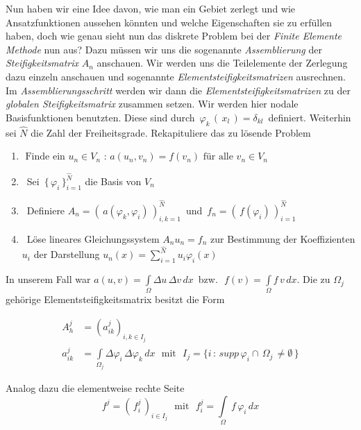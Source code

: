 Nun haben wir eine Idee davon, wie man ein Gebiet zerlegt und wie Ansatzfunktionen aussehen könnten und welche Eigenschaften sie zu erfüllen haben, doch wie genau sieht nun das diskrete Problem bei der \textit{Finite Elemente Methode} nun aus? Dazu müssen wir uns die sogenannte \textit{Assemblierung} der \textit{Steifigkeitsmatrix} $A_n$ anschauen. Wir werden uns die Teilelemente der Zerlegung dazu einzeln anschauen und sogenannte \textit{Elementsteifigkeitsmatrizen} ausrechnen. Im \textit{Assemblierungsschritt} werden wir dann die  \textit{Elementsteifigkeitsmatrizen} zu der \textit{globalen Steifigkeitsmatrix} zusammen setzen.
Wir werden hier nodale Basisfunktionen benutzten. Diese sind durch $\, \varphi_k \, ( \, x_l \, ) = \delta_{kl} \,$ definiert. Weiterhin sei $\hat{N}$ die Zahl der Freiheitsgrade. Rekapituliere das zu lösende Problem

\begin{framed}
\begin{enumerate}
\item $
\text{ Finde ein } u_n \in V_n \text{ : } a(u_n,v_n) = f(v_n) \text{ für alle } v_n \in V_n
$
\item ~Sei $\, \{ \, \varphi_i \, \}_{i=1}^{\hat{N}}$ die Basis  von $V_n$
\item ~Definiere $A_n=( \, a(\varphi_k,\varphi_i) \, )_{i,k=1}^{\hat{N}} \, $ und $ \, f_n=( \, f(\varphi_i) \, )_{i=1}^{\hat{N}}$
\item ~Löse lineares Gleichungssystem $A_n u_n=f_n$ zur Bestimmung der Koeffizienten $u_i$ der Darstellung $u_n(x)=\sum_{i=1}^{\hat{N}} u_i \varphi_i(x)$
\end{enumerate}
\end{framed}

In unserem Fall war $a(u,v)=\int\limits_{\Omega} \Delta u \, \Delta v \, dx \, $ bzw. $\, \, f(v)=\int\limits_{\Omega} f \, v \, dx$. Die zu $\Omega_j$ gehörige Elementsteifigkeitsmatrix besitzt die Form

\begin{equation*}
\begin{aligned}
A_h^j &= (a_{ik}^j)_{i,k \in I_j} \\
a_{ik}^j &= \int\limits_{\Omega_j} \Delta \varphi_i \, \Delta \varphi_k \, dx \, \, \text{ mit } \, \, 
I_j =\{ i \, : \, supp \, \varphi_i \cap \, \Omega_j \, \neq \emptyset \, \}
\end{aligned}
\end{equation*}

Analog dazu die elementweise rechte Seite
\begin{equation*}
f^j = (\, f_i^j \, )_{i \in I_j} \, \, \text{ mit } \, \, f_i^j = \int\limits_{\Omega} \, f \, \varphi_i \, dx 
\end{equation*}

